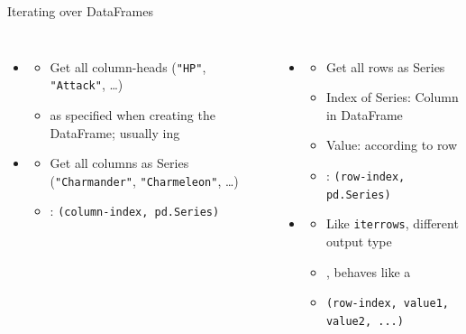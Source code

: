 \begin{frame}{Iterating over DataFrames}
%
\begin{columns}[T]
\begin{itemize}
\item {}
	\begin{itemize}
	\item Get all column-heads (\eg \texttt{"HP"}, \texttt{"Attack"}, \ldots)
	\item {} as specified when creating the DataFrame; usually ing
	\end{itemize}
\item {}
	\begin{itemize}
	\item Get all columns as Series (\eg \texttt{"Charmander"}, \texttt{"Charmeleon"}, \ldots)
	\item {}: \texttt{(column-index, pd.Series)}
	\end{itemize}
\end{itemize}
%
\begin{itemize}
\item {}
	\begin{itemize}
	\item Get all rows as Series
	\item Index of Series: Column in DataFrame
	\item Value: according to row
	\item {}: \texttt{(row-index, pd.Series)}
	\end{itemize}
\item {}
	\begin{itemize}
	\item Like \texttt{iterrows}, different output type
	\item {}, behaves like a 
	\item \texttt{(row-index, value1, value2, ...)}
	\end{itemize}
\end{itemize}
\end{columns}
%
\end{frame}


